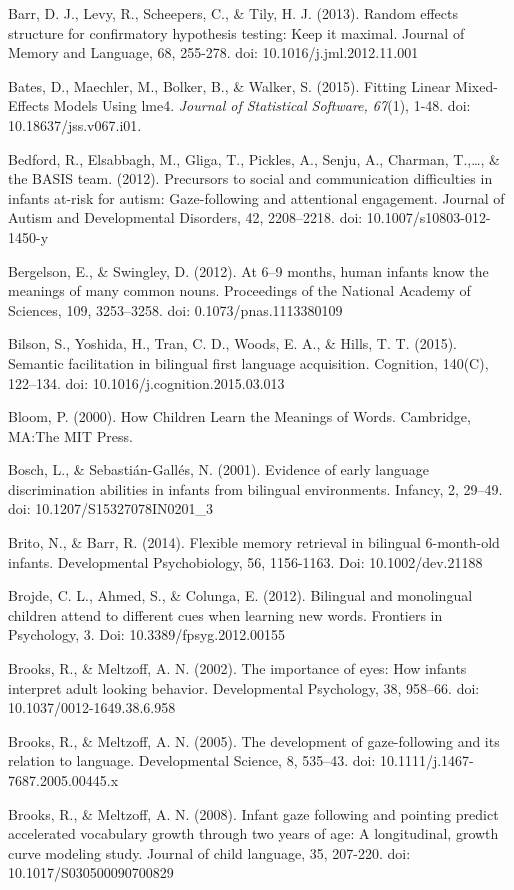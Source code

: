 \documentclass[,man,floatsintext]{apa6}
\begin{document}
Barr, D. J., Levy, R., Scheepers, C., \& Tily, H. J. (2013). Random effects structure for confirmatory hypothesis testing: Keep it maximal. Journal of Memory and Language, 68, 255-278. doi: 10.1016/j.jml.2012.11.001

Bates, D., Maechler, M., Bolker, B., \& Walker, S. (2015). Fitting Linear Mixed-Effects Models Using lme4. \emph{Journal of Statistical Software, 67}(1), 1-48. doi: 10.18637/jss.v067.i01.

Bedford, R., Elsabbagh, M., Gliga, T., Pickles, A., Senju, A., Charman, T.,\ldots{}, \& the BASIS team. (2012). Precursors to social and communication difficulties in infants at-risk for autism: Gaze-following and attentional engagement. Journal of Autism and Developmental Disorders, 42, 2208--2218. doi: 10.1007/s10803-012-1450-y

Bergelson, E., \& Swingley, D. (2012). At 6--9 months, human infants know the meanings of many common nouns. Proceedings of the National Academy of Sciences, 109, 3253--3258. doi: 0.1073/pnas.1113380109

Bilson, S., Yoshida, H., Tran, C. D., Woods, E. A., \& Hills, T. T. (2015). Semantic facilitation in bilingual first language acquisition. Cognition, 140(C), 122--134. doi: 10.1016/j.cognition.2015.03.013

Bloom, P. (2000). How Children Learn the Meanings of Words. Cambridge, MA:The MIT Press.

Bosch, L., \& Sebastián-Gallés, N. (2001). Evidence of early language discrimination abilities in infants from bilingual environments. Infancy, 2, 29--49. doi: 10.1207/S15327078IN0201\_3

Brito, N., \& Barr, R. (2014). Flexible memory retrieval in bilingual 6-month-old infants. Developmental Psychobiology, 56, 1156-1163. Doi: 10.1002/dev.21188

Brojde, C. L., Ahmed, S., \& Colunga, E. (2012). Bilingual and monolingual children attend to different cues when learning new words. Frontiers in Psychology, 3. Doi: 10.3389/fpsyg.2012.00155

Brooks, R., \& Meltzoff, A. N. (2002). The importance of eyes: How infants interpret adult looking behavior. Developmental Psychology, 38, 958--66. doi: 10.1037/0012-1649.38.6.958

Brooks, R., \& Meltzoff, A. N. (2005). The development of gaze-following and its relation to language. Developmental Science, 8, 535--43. doi: 10.1111/j.1467-7687.2005.00445.x

Brooks, R., \& Meltzoff, A. N. (2008). Infant gaze following and pointing predict accelerated vocabulary growth through two years of age: A longitudinal, growth curve modeling study. Journal of child language, 35, 207-220. doi: 10.1017/S030500090700829
\end{document}
